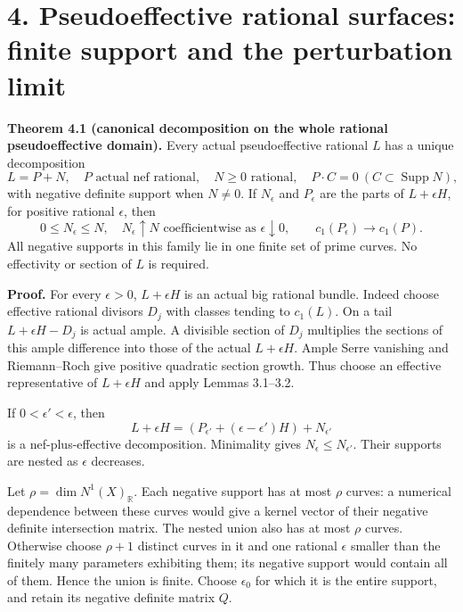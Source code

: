 \documentclass[
  10pt,
]{article}
\begin{document}
\section{4. Pseudoeffective rational surfaces: finite support and the
perturbation
limit}\label{pseudoeffective-rational-surfaces-finite-support-and-the-perturbation-limit}

\textbf{Theorem 4.1 (canonical decomposition on the whole rational
pseudoeffective domain).} Every actual pseudoeffective rational \(L\)
has a unique decomposition \[
 L=P+N,
 \quad P\text{ actual nef rational},\quad N\geq0\text{ rational},
 \quad P\cdot C=0\ (C\subset\operatorname{Supp}N),
                                                               \tag{4.1}
\] with negative definite support when \(N\ne0\). If \(N_\epsilon\) and
\(P_\epsilon\) are the parts of \(L+\epsilon H\), for positive rational
\(\epsilon\), then \[
 0\leq N_\epsilon\leq N,\quad
 N_\epsilon\uparrow N\text{ coefficientwise as }\epsilon\downarrow0,
 \qquad c_1(P_\epsilon)\to c_1(P).                              \tag{4.2}
\] All negative supports in this family lie in one finite set of prime
curves. No effectivity or section of \(L\) is required.

\textbf{Proof.} For every \(\epsilon>0\), \(L+\epsilon H\) is an actual
big rational bundle. Indeed choose effective rational divisors \(D_j\)
with classes tending to \(c_1(L)\). On a tail \(L+\epsilon H-D_j\) is
actual ample. A divisible section of \(D_j\) multiplies the sections of
this ample difference into those of the actual \(L+\epsilon H\). Ample
Serre vanishing and Riemann--Roch give positive quadratic section
growth. Thus choose an effective representative of \(L+\epsilon H\) and
apply Lemmas 3.1--3.2.

If \(0<\epsilon'<\epsilon\), then \[
 L+\epsilon H=(P_{\epsilon'}+(\epsilon-\epsilon')H)+N_{\epsilon'}
\] is a nef-plus-effective decomposition. Minimality gives
\(N_\epsilon\leq N_{\epsilon'}\). Their supports are nested as
\(\epsilon\) decreases.

Let \(\rho=\dim N^1(X)_{\mathbb R}\). Each negative support has at most
\(\rho\) curves: a numerical dependence between these curves would give
a kernel vector of their negative definite intersection matrix. The
nested union also has at most \(\rho\) curves. Otherwise choose
\(\rho+1\) distinct curves in it and one rational \(\epsilon\) smaller
than the finitely many parameters exhibiting them; its negative support
would contain all of them. Hence the union is finite. Choose
\(\epsilon_0\) for which it is the entire support, and retain its
negative definite matrix \(Q\).
\end{document}
